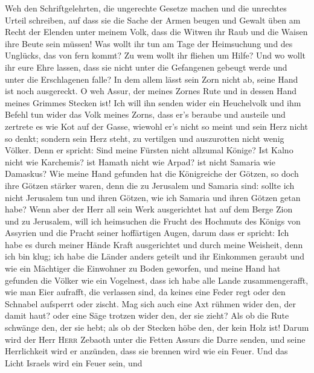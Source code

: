  Weh den Schriftgelehrten, die ungerechte Gesetze machen
und die unrechtes Urteil schreiben,  auf dass sie die
Sache der Armen beugen und Gewalt üben am Recht der Elenden unter meinem
Volk, dass die Witwen ihr Raub und die Waisen ihre Beute sein müssen!
 Was wollt ihr tun am Tage der Heimsuchung und des
Unglücks, das von fern kommt? Zu wem wollt ihr fliehen um Hilfe? Und wo
wollt ihr eure Ehre lassen,  dass sie nicht unter die
Gefangenen gebeugt werde und unter die Erschlagenen falle? In dem allem
lässt sein Zorn nicht ab, seine Hand ist noch ausgereckt. 
O weh Assur, der meines Zornes Rute und in dessen Hand meines Grimmes
Stecken ist!  Ich will ihn senden wider ein Heuchelvolk
und ihm Befehl tun wider das Volk meines Zorns, dass er's beraube und
austeile und zertrete es wie Kot auf der Gasse,  wiewohl
er's nicht so meint und sein Herz nicht so denkt; sondern sein Herz
steht, zu vertilgen und auszurotten nicht wenig Völker. 
Denn er spricht: Sind meine Fürsten nicht allzumal Könige?
 Ist Kalno nicht wie Karchemis? ist Hamath nicht wie
Arpad? ist nicht Samaria wie Damaskus?  Wie meine Hand
gefunden hat die Königreiche der Götzen, so doch ihre Götzen stärker
waren, denn die zu Jerusalem und Samaria sind:  sollte
ich nicht Jerusalem tun und ihren Götzen, wie ich Samaria und ihren
Götzen getan habe?  Wenn aber der Herr all sein Werk
ausgerichtet hat auf dem Berge Zion und zu Jerusalem, will ich
heimsuchen die Frucht des Hochmuts des Königs von Assyrien und die
Pracht seiner hoffärtigen Augen,  darum dass er spricht:
Ich habe es durch meiner Hände Kraft ausgerichtet und durch meine
Weisheit, denn ich bin klug; ich habe die Länder anders geteilt und ihr
Einkommen geraubt und wie ein Mächtiger die Einwohner zu Boden geworfen,
 und meine Hand hat gefunden die Völker wie ein
Vogelnest, dass ich habe alle Lande zusammengerafft, wie man Eier
aufrafft, die verlassen sind, da keines eine Feder regt oder den
Schnabel aufsperrt oder zischt.  Mag sich auch eine Axt
rühmen wider den, der damit haut? oder eine Säge trotzen wider den, der
sie zieht? Als ob die Rute schwänge den, der sie hebt; als ob der
Stecken höbe den, der kein Holz ist!  Darum wird der Herr
\textsc{Herr} Zebaoth unter die Fetten Assurs die Darre senden, und
seine Herrlichkeit wird er anzünden, dass sie brennen wird wie ein
Feuer.  Und das Licht Israels wird ein Feuer sein, und
